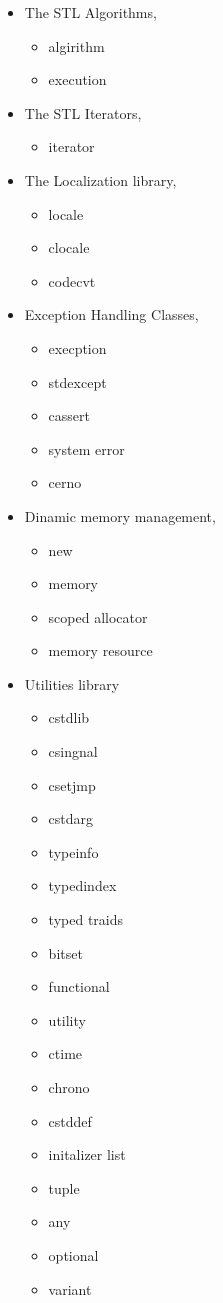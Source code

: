 \documentclass[12pt]{article}
\begin{document}
\begin{enumerate}
\begin{itemize}
	\item The STL Algorithms,
		\begin{itemize}
		\item algirithm
		\item execution
		\end{itemize}

	\item The STL Iterators,
		\begin{itemize}
		\item iterator
		\end{itemize}
		
	\item The Localization library,
		\begin{itemize}
		\item locale
		\item clocale
		\item codecvt
		\end{itemize}
		
	\item Exception Handling Classes,
		\begin{itemize}
		\item execption
		\item stdexcept
		\item cassert
		\item system error
		\item cerno
		\end{itemize}
		
	\item Dinamic memory management,
		\begin{itemize}
		\item new
		\item memory
		\item scoped allocator
		\item memory resource		
		\end{itemize}
		
	\item Utilities library
		\begin{itemize}
		\item cstdlib
		\item csingnal
		\item csetjmp
		\item cstdarg
		\item typeinfo
		\item typedindex
		\item typed traids
		\item bitset
		\item functional
		\item utility
		\item ctime
		\item chrono
		\item cstddef
		\item initalizer list
		\item tuple
		\item any
		\item optional
		\item variant
		\end{itemize}
		

\end{itemize}
\end{enumerate}
\end{document}
